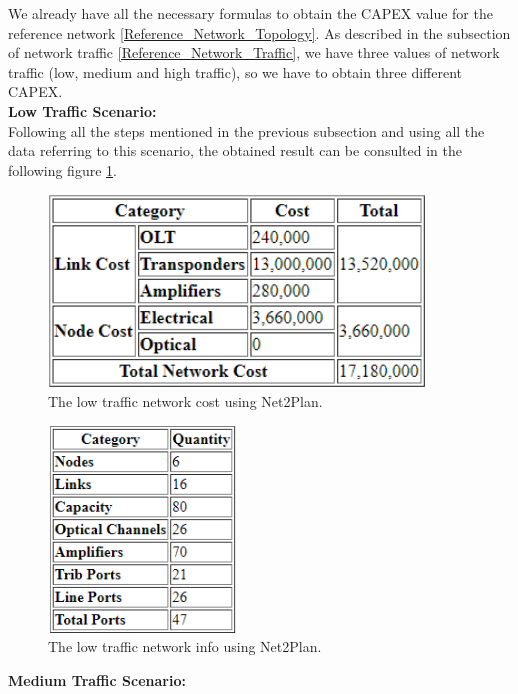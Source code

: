 We already have all the necessary formulas to obtain the CAPEX value for the reference network \ref{Reference_Network_Topology}. As described in the subsection of network traffic \ref{Reference_Network_Traffic}, we have three values of network traffic (low, medium and high traffic), so we have to obtain three different CAPEX.\\

\textbf{Low Traffic Scenario:}\\

Following all the steps mentioned in the previous subsection and using all the data referring to this scenario, the obtained result can be consulted in the following figure \ref{Low_Network_Cost_Opaque}.

\begin{figure}[h!]
\centering
\includegraphics[width=10cm]{sdf/heuristic/figures/Low_Network_Cost_Opaque}
\caption{The low traffic network cost using Net2Plan.}
\label{Low_Network_Cost_Opaque}
\end{figure}

\begin{figure}[h!]
\centering
\includegraphics[width=5cm]{sdf/heuristic/figures/Low_Network_Info_Opaque}
\caption{The low traffic network info using Net2Plan.}
\label{Low_Network_Info_Opaque}
\end{figure}

\newpage
\textbf{Medium Traffic Scenario:}\\

